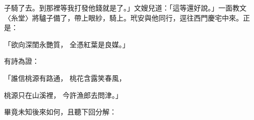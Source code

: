 子騎了去。到那裡等我打發他錢就是了。」文嫂兒道：「這等還好說。」一面教文〈糸堂〉將驢子備了，帶上眼紗，騎上。玳安與他同行，逕往西門慶宅中來。正是：

「欲向深閨永艷質，  全憑紅葉是良媒。」

有詩為證：

「誰信桃源有路通，  桃花含露笑春風，

桃源只在山溪裡，  今許漁郎去問津。」

畢竟未知後來如何，且聽下回分解：


